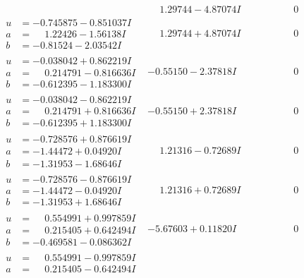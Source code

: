 \documentclass[1p]{elsarticle_modified}
\theoremstyle{definition}
\begin{document}
$$\begin{array}{c|c|c}
 & \phantom{-}1.29744 - 4.87074 I & \phantom{-0.000000 } 0 \\ \hline\begin{aligned}
u &= -0.745875 - 0.851037 I \\
a &= \phantom{-}1.22426 - 1.56138 I \\
b &= -0.81524 - 2.03542 I\end{aligned}
 & \phantom{-}1.29744 + 4.87074 I & \phantom{-0.000000 } 0 \\ \hline\begin{aligned}
u &= -0.038042 + 0.862219 I \\
a &= \phantom{-}0.214791 - 0.816636 I \\
b &= -0.612395 - 1.183300 I\end{aligned}
 & -0.55150 - 2.37818 I & \phantom{-0.000000 } 0 \\ \hline\begin{aligned}
u &= -0.038042 - 0.862219 I \\
a &= \phantom{-}0.214791 + 0.816636 I \\
b &= -0.612395 + 1.183300 I\end{aligned}
 & -0.55150 + 2.37818 I & \phantom{-0.000000 } 0 \\ \hline\begin{aligned}
u &= -0.728576 + 0.876619 I \\
a &= -1.44472 + 0.04920 I \\
b &= -1.31953 - 1.68646 I\end{aligned}
 & \phantom{-}1.21316 - 0.72689 I & \phantom{-0.000000 } 0 \\ \hline\begin{aligned}
u &= -0.728576 - 0.876619 I \\
a &= -1.44472 - 0.04920 I \\
b &= -1.31953 + 1.68646 I\end{aligned}
 & \phantom{-}1.21316 + 0.72689 I & \phantom{-0.000000 } 0 \\ \hline\begin{aligned}
u &= \phantom{-}0.554991 + 0.997859 I \\
a &= \phantom{-}0.215405 + 0.642494 I \\
b &= -0.469581 - 0.086362 I\end{aligned}
 & -5.67603 + 0.11820 I & \phantom{-0.000000 } 0 \\ \hline\begin{aligned}
u &= \phantom{-}0.554991 - 0.997859 I \\
a &= \phantom{-}0.215405 - 0.642494 I \\

\end{aligned}
\end{array}$$
\end{document}
